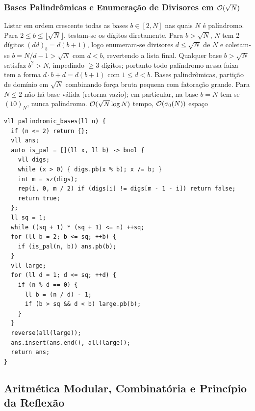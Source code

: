 \subsubsection{Bases Palindrômicas e Enumeração de Divisores em $\mathcal{O}(\sqrt{N})$}
\algobox
  {Listar em ordem crescente todas as bases $b \in [2, N]$ nas quais $N$ é palíndromo.}
  {Para $2 \le b \le \lfloor\sqrt{N}\rfloor$, testam-se os dígitos diretamente. Para $b > \sqrt{N}$, $N$ tem 2 dígitos $(dd)_b = d(b+1)$, logo enumeram-se divisores $d \le \sqrt{N}$ de $N$ e coletam-se $b = N/d - 1 > \sqrt{N}$ com $d < b$, revertendo a lista final.}
  {Qualquer base $b > \sqrt{N}$ satisfaz $b^2 > N$, impedindo $\ge 3$ dígitos; portanto todo palíndromo nessa faixa tem a forma $d \cdot b + d = d(b + 1)$ com $1 \le d < b$.}
  {Bases palindrômicas, partição de domínio em $\sqrt{N}$ combinando força bruta pequena com fatoração grande.}
  {Para $N \le 2$ não há base válida (retorna vazio); em particular, na base $b = N$ tem-se $(10)_N$, nunca palíndromo.}
  {$\mathcal{O}(\sqrt{N} \log N)$ tempo, $\mathcal{O}(\sigma_0(N))$ espaço}

\begin{lstlisting}
vll palindromic_bases(ll n) {
  if (n <= 2) return {};
  vll ans;
  auto is_pal = [](ll x, ll b) -> bool {
    vll digs;
    while (x > 0) { digs.pb(x % b); x /= b; }
    int m = sz(digs);
    rep(i, 0, m / 2) if (digs[i] != digs[m - 1 - i]) return false;
    return true;
  };
  ll sq = 1;
  while ((sq + 1) * (sq + 1) <= n) ++sq;
  for (ll b = 2; b <= sq; ++b) {
    if (is_pal(n, b)) ans.pb(b);
  }
  vll large;
  for (ll d = 1; d <= sq; ++d) {
    if (n % d == 0) {
      ll b = (n / d) - 1;
      if (b > sq && d < b) large.pb(b);
    }
  }
  reverse(all(large));
  ans.insert(ans.end(), all(large));
  return ans;
}
\end{lstlisting}

\subsection{Aritmética Modular, Combinatória e Princípio da Reflexão}

